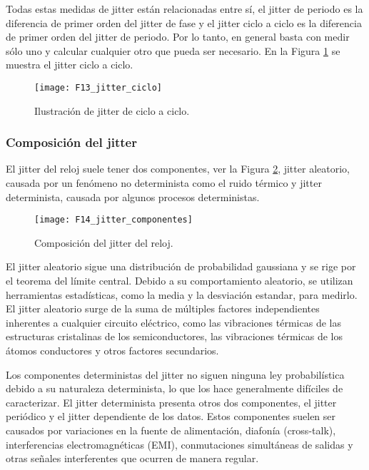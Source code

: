                 Todas estas medidas de jitter están relacionadas entre sí, el jitter de periodo es la diferencia de primer orden del jitter de fase y el jitter ciclo a ciclo es la diferencia de primer orden del jitter de periodo. Por lo tanto, en general basta con medir sólo uno y calcular cualquier otro que pueda ser necesario. En la Figura \ref{fig:F13_jitter_ciclo} se muestra el jitter ciclo a ciclo.

                \begin{figure}[hbtp]
                    \caption{Ilustración de jitter de ciclo a ciclo.}
                    \centering
                    \texttt{[image: F13\_jitter\_ciclo]}
                    \label{fig:F13_jitter_ciclo}
                \end{figure}

            \subsubsection{Composición del jitter}

                El jitter del reloj suele tener dos componentes, ver la Figura \ref{fig:F14_jitter_componentes}, jitter aleatorio, causada por un fenómeno no determinista como el ruido térmico y jitter determinista, causada por algunos procesos deterministas.

                \begin{figure}[hbtp]
                    \caption{Composición del jitter del reloj.}
                    \centering
                    \texttt{[image: F14\_jitter\_componentes]}
                    \label{fig:F14_jitter_componentes}
                \end{figure}

                El jitter aleatorio sigue una distribución de probabilidad gaussiana y se rige por el teorema del límite central. Debido a su comportamiento aleatorio, se utilizan herramientas estadísticas, como la media y la desviación estandar, para medirlo. El jitter aleatorio surge de la suma de múltiples factores independientes inherentes a cualquier circuito eléctrico, como las vibraciones térmicas de las estructuras cristalinas de los semiconductores, las vibraciones térmicas de los átomos conductores y otros factores secundarios.

                Los componentes deterministas del jitter no siguen ninguna ley probabilística debido a su naturaleza determinista, lo que los hace generalmente difíciles de caracterizar. El jitter determinista presenta otros dos componentes, el jitter periódico y el jitter dependiente de los datos. Estos componentes suelen ser causados por variaciones en la fuente de alimentación, diafonía (cross-talk), interferencias electromagnéticas (EMI), conmutaciones simultáneas de salidas y otras señales interferentes que ocurren de manera regular.


